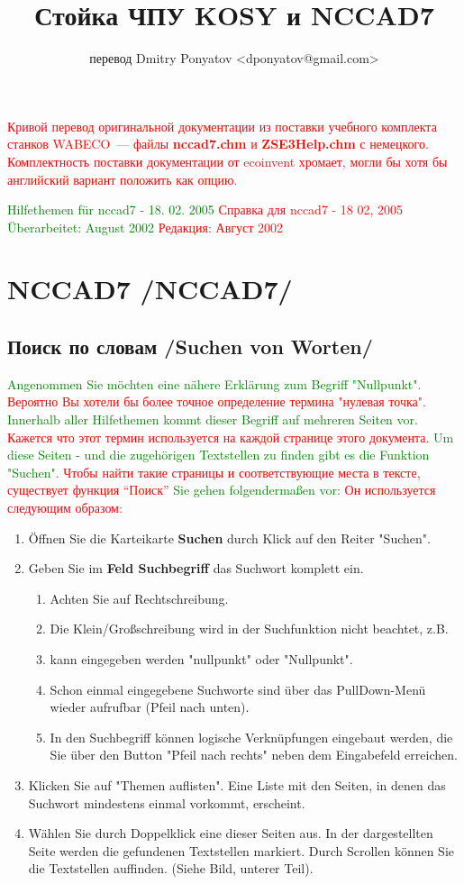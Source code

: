 \documentclass[14pt,a4paper]{book}
\title{Стойка ЧПУ KOSY и NCCAD7}
\author{перевод Dmitry Ponyatov <dponyatov@gmail.com>}
\newcommand{\DE}[1]{\textcolor{green}{#1}}
\newcommand{\RU}[1]{\textcolor{red}{#1}}
\newcommand{\TRpart}[2]{\part{#2 /#1/}}
\newcommand{\TRchapter}[2]{\chapter{#2 /#1/}}
\newcommand{\file}[1]{\textbf{#1}}
\begin{document}
\maketitle

\RU{Кривой перевод оригинальной документации из поставки учебного комплекта станков
WABECO~--- файлы \file{nccad7.chm} и \file{ZSE3Help.chm} с немецкого.
Комплектность поставки документации от ecoinvent хромает, могли бы хотя бы
английский вариант положить как опцию.}

\tableofcontents

\DE{Hilfethemen für nccad7 - 18. 02. 2005}
\RU{Справка для nccad7 - 18 02, 2005}
\DE{Überarbeitet: August 2002}
\RU{Редакция: Август 2002}

\TRpart{NCCAD7}{NCCAD7}

\TRchapter{Suchen von Worten}{Поиск по словам}

\bigskip 

\DE{Angenommen Sie möchten eine nähere Erklärung zum Begriff "Nullpunkt".}
\RU{Вероятно Вы хотели бы более точное определение термина
"нулевая точка".}
\DE{Innerhalb aller Hilfethemen kommt dieser Begriff auf mehreren Seiten vor.}
\RU{Кажется что этот термин используется на каждой странице этого
документа.}
\DE{Um diese Seiten - und die zugehörigen Textstellen zu finden gibt es die
Funktion "Suchen".}
\RU{Чтобы найти такие страницы и соответствующие места в тексте,
существует функция ``Поиск''}
\DE{Sie gehen folgendermaßen vor:}
\RU{Он используется следующим образом:}
\begin{enumerate}
  \item Öffnen Sie die Karteikarte \textbf{Suchen} durch Klick auf den Reiter
  "Suchen".
  \item Geben Sie im \textbf{Feld Suchbegriff} das Suchwort komplett ein. 
\begin{enumerate}
  \item Achten Sie auf Rechtschreibung. 
  \item Die Klein/Großschreibung wird in der Suchfunktion nicht beachtet, z.B.
  \item kann eingegeben werden "nullpunkt" oder "Nullpunkt".
  \item Schon einmal eingegebene Suchworte sind über das PullDown-Menü wieder
  aufrufbar (Pfeil nach unten).
  \item In den Suchbegriff können logische Verknüpfungen eingebaut werden, die
Sie über den Button "Pfeil nach rechts" neben dem Eingabefeld erreichen.
\end{enumerate}
  \item Klicken Sie auf "Themen auflisten". Eine Liste mit den Seiten, in denen
das Suchwort mindestens einmal vorkommt, erscheint.
  \item Wählen Sie durch Doppelklick eine dieser Seiten aus. In der
dargestellten Seite werden die gefundenen Textstellen markiert. Durch Scrollen können
 Sie die Textstellen auffinden. (Siehe Bild, unterer Teil).
\end{enumerate}
\end{document}
